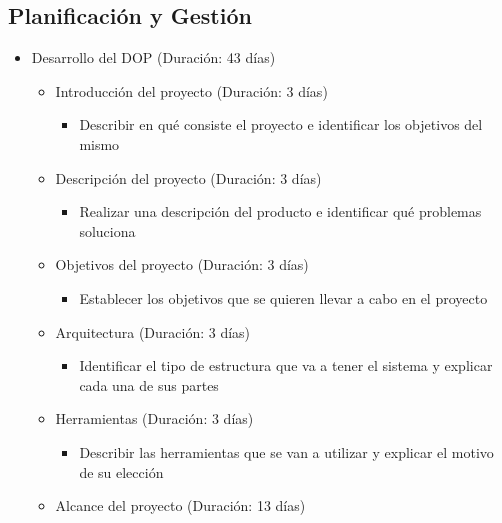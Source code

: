 \documentclass{report}
\begin{document}
            \subsection{Planificación y Gestión}
                \begin{itemize}
                    \item Desarrollo del DOP (Duración: 43 días)
                    \begin{itemize}
                        \item Introducción del proyecto (Duración: 3 días)
                        \begin{itemize}
                            \item Describir en qué consiste el proyecto e identificar los objetivos del mismo
                        \end{itemize}
                        \item Descripción del proyecto (Duración: 3 días)
                        \begin{itemize}
                            \item Realizar una descripción del producto e identificar qué problemas soluciona
                        \end{itemize}
                        \item Objetivos del proyecto (Duración: 3 días)
                        \begin{itemize}
                            \item Establecer los objetivos que se quieren llevar a cabo en el proyecto
                        \end{itemize}
                        \item Arquitectura (Duración: 3 días)
                        \begin{itemize}
                            \item Identificar el tipo de estructura que va a tener el sistema y explicar cada una de sus partes
                        \end{itemize}
                        \item Herramientas (Duración: 3 días)
                        \begin{itemize}
                            \item Describir las herramientas que se van a utilizar y explicar el motivo de su elección
                        \end{itemize}
                        \item Alcance del proyecto (Duración: 13 días)

\end{itemize}
\end{itemize}
\end{document}
